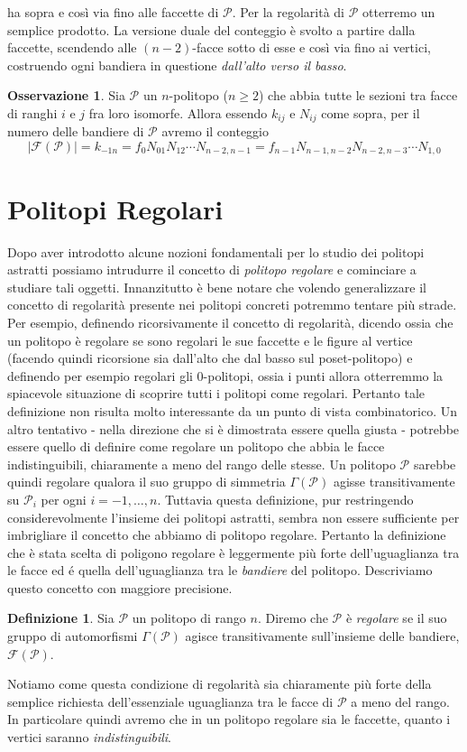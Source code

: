 \documentclass[a4paper,12pt]{report}
\newcommand{\p}{\mathcal{P}}
\theoremstyle{plain}
\theoremstyle{definition}
\newtheorem{defin}[teo]{Definizione}
\newtheorem{oss}[teo]{Osservazione}
\begin{document}
ha sopra e cos\`i via fino alle faccette di $\p$. Per la regolarit\`a di $\p$ otterremo un semplice prodotto.
La versione duale del conteggio \`e svolto a partire dalla faccette, scendendo alle $(n-2)$-facce sotto di esse e cos\`i via fino ai vertici,
costruendo ogni bandiera in questione \emph{dall'alto verso il basso}.
\begin{oss}
Sia $\p$ un $n$-politopo ($n\geq 2$) che abbia tutte le sezioni tra facce di ranghi $i$ e $j$ fra loro isomorfe.
Allora essendo $k_{ij}$ e $N_{ij}$ come sopra, per il numero delle bandiere di $\p$ avremo il conteggio
\begin{equation}
\left|\mathcal{F}(\p)\right|=k_{-1n}=f_0N_{01}N_{12}\cdots N_{n-2,n-1}=f_{n-1}N_{n-1,n-2}N_{n-2,n-3}\cdots N_{1,0}
\end{equation}
\end{oss}

\section{Politopi Regolari}
Dopo aver introdotto alcune nozioni fondamentali per lo studio dei politopi astratti possiamo intrudurre il concetto di \emph{politopo regolare} e
cominciare a studiare tali oggetti. Innanzitutto \`e bene notare che volendo generalizzare il concetto di regolarit\`a presente nei politopi concreti
potremmo tentare pi\`u strade. Per esempio, definendo ricorsivamente il concetto di regolarit\`a, dicendo ossia che un politopo \`e regolare se sono
regolari le sue faccette e le figure al vertice (facendo quindi ricorsione sia dall'alto che dal basso sul poset-politopo) e definendo per esempio regolari
gli $0$-politopi, ossia i punti allora otterremmo la spiacevole situazione di scoprire tutti i politopi come regolari. Pertanto tale definizione non risulta
molto interessante da un punto di vista combinatorico.
Un altro tentativo - nella direzione che si \`e dimostrata essere quella giusta - potrebbe essere quello di definire come regolare un politopo che abbia le
facce indistinguibili, chiaramente a meno del rango delle stesse. Un politopo $\p$ sarebbe quindi regolare qualora il suo gruppo di simmetria
$\Gamma(\p)$ agisse transitivamente su $\p_i$ per ogni $i=-1,\dots,n$. Tuttavia questa definizione, pur restringendo considerevolmente l'insieme dei
politopi astratti, sembra non essere sufficiente per imbrigliare il concetto che abbiamo di politopo regolare.
Pertanto la definizione che \`e stata scelta di poligono regolare \`e leggermente pi\`u forte dell'uguaglianza tra le facce ed \'e quella dell'uguaglianza
tra le \emph{bandiere} del politopo. Descriviamo questo concetto con maggiore precisione.
\begin{defin}
Sia $\p$ un politopo di rango $n$. Diremo che $\p$ \`e \emph{regolare} se il suo gruppo di automorfismi $\Gamma(\p)$ agisce transitivamente sull'insieme
delle bandiere, $\mathcal{F}(\p)$.
\end{defin}
Notiamo come questa condizione di regolarit\`a sia chiaramente pi\`u forte della semplice richiesta dell'essenziale uguaglianza tra le facce di $\p$ a meno
del rango. In particolare quindi avremo che in un politopo regolare sia le faccette, quanto i vertici saranno \emph{indistinguibili}.
\end{document}
